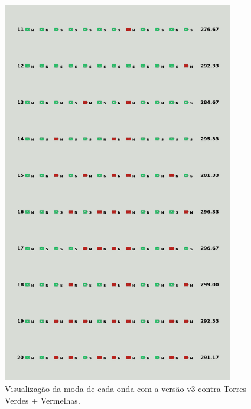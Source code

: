 \begin{figure}[H]
  \centering
  \includegraphics[width=0.9\textwidth]{figuras/td/td_greenred_ai_mode_3_2.png}
  \caption{Visualização da moda de cada onda com a versão v3 contra Torres Verdes + Vermelhas.}
  \label{fig:td-moda-greenred-3-2}
\end{figure}

